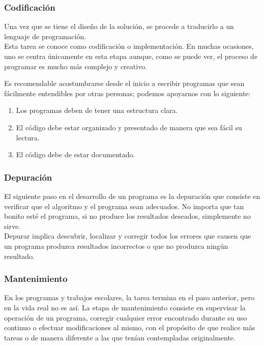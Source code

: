\begin{frame}
\frametitle{Codificación}
Una vez que se tiene el diseño de la solución, se procede a traducirlo a un lenguaje de programación.
\\
\bigskip
Esta tarea se conoce como codificación o implementación. En muchas ocasiones, uno se centra únicamente en esta etapa aunque, como se puede ver, el proceso de programar es mucho más complejo y creativo.
\end{frame}
\begin{frame}[fragile]
Es recomendable acostumbrarse desde el inicio a escribir programas que sean fácilmente entendibles por otras personas; podemos apoyarnos con lo siguiente:
\begin{enumerate}[<+->]
\item Los programas deben de tener una estructura clara.
\item El código debe estar organizado y presentado de manera que sea fácil su lectura.
\item El código debe de estar documentado.
\end{enumerate}
\end{frame}
\begin{frame}
\frametitle{Depuración}
El siguiente paso en el desarrollo de un programa es la depuración que consiste en verificar que el algoritmo y el programa sean adecuados. No importa que tan bonito esté el programa, si no produce los resultados deseados, simplemente no sirve.
\\
\bigskip
Depurar implica descubrir, localizar y corregir todos los errores que causen que un programa produzca resultados incorrectos o que no produzca ningún resultado.
\end{frame}
\begin{frame}
\frametitle{Mantenimiento}
En los programas y trabajos escolares, la tarea termina en el paso anterior, pero en la vida real no es así. La etapa de mantenimiento consiste en supervisar la operación de un programa, corregir cualquier error encontrado durante su uso continuo o efectuar modificaciones al mismo, con el propósito de que realice más tareas o de manera diferente a las que tenían contempladas originalmente.
\end{frame}
